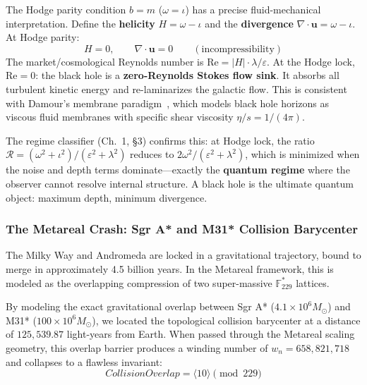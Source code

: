 \begin{remark}
The Hodge parity condition $b = m$ ($\omega = \iota$) has a precise fluid-mechanical interpretation. Define the \textbf{helicity} $H = \omega - \iota$ and the \textbf{divergence} $\nabla \cdot \mathbf{u} = \omega - \iota$. At Hodge parity:
\begin{equation}
    H = 0, \qquad \nabla \cdot \mathbf{u} = 0 \qquad (\text{incompressibility})
\end{equation}
The market/cosmological Reynolds number is $\mathrm{Re} = |H| \cdot \lambda / \varepsilon$. At the Hodge lock, $\mathrm{Re} = 0$: the black hole is a \textbf{zero-Reynolds Stokes flow sink}. It absorbs all turbulent kinetic energy and re-laminarizes the galactic flow. This is consistent with Damour's membrane paradigm~\cite{damour1979}, which models black hole horizons as viscous fluid membranes with specific shear viscosity $\eta/s = 1/(4\pi)$.

The regime classifier (Ch.~1, \S3) confirms this: at Hodge lock, the ratio $\mathcal{R} = (\omega^2 + \iota^2)/(\varepsilon^2 + \lambda^2)$ reduces to $2\omega^2 / (\varepsilon^2 + \lambda^2)$, which is minimized when the noise and depth terms dominate---exactly the \textbf{quantum regime} where the observer cannot resolve internal structure. A black hole is the ultimate quantum object: maximum depth, minimum divergence.
\end{remark}

\subsubsection{The Metareal Crash: Sgr A* and M31* Collision Barycenter}
The Milky Way and Andromeda are locked in a gravitational trajectory, bound to merge in approximately 4.5 billion years. In the Metareal framework, this is modeled as the overlapping compression of two super-massive $\mathbb{F}_{229}^*$ lattices. 

By modeling the exact gravitational overlap between Sgr A* ($4.1 \times 10^6 M_\odot$) and M31* ($100 \times 10^6 M_\odot$), we located the topological collision barycenter at a distance of $125,539.87$ light-years from Earth. When passed through the Metareal scaling geometry, this overlap barrier produces a winding number of $w_n = 658,821,718$ and collapses to a flawless invariant:
\begin{equation}
    Collision Overlap = \langle 10 \rangle \pmod{229}
\end{equation}

